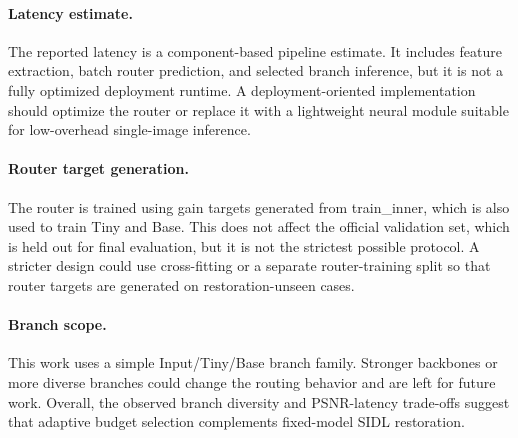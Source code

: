 \documentclass[11pt]{article}
\begin{document}
\paragraph{Latency estimate.}
The reported latency is a component-based pipeline estimate.
It includes feature extraction, batch router prediction, and selected branch inference, but it is not a fully optimized deployment runtime.
A deployment-oriented implementation should optimize the router or replace it with a lightweight neural module suitable for low-overhead single-image inference.

\paragraph{Router target generation.}
The router is trained using gain targets generated from train\_inner, which is also used to train Tiny and Base.
This does not affect the official validation set, which is held out for final evaluation, but it is not the strictest possible protocol.
A stricter design could use cross-fitting or a separate router-training split so that router targets are generated on restoration-unseen cases.

\paragraph{Branch scope.}
This work uses a simple Input/Tiny/Base branch family.
Stronger backbones or more diverse branches could change the routing behavior and are left for future work.
Overall, the observed branch diversity and PSNR-latency trade-offs suggest that adaptive budget selection complements fixed-model SIDL restoration.

\clearpage


\end{document}
